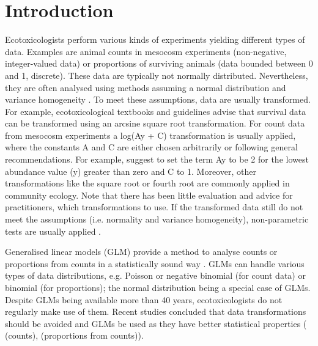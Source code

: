 \documentclass[twocolumn, natbib]{svjour3}
\providecommand{\DIFadd}[1]{{\protect\color{blue}\uwave{#1}}} %
\providecommand{\DIFaddbegin}{} %
\providecommand{\DIFaddend}{} %
\providecommand{\DIFdelbegin}{} %
\providecommand{\DIFdelend}{} %
\begin{document}
\section{Introduction}
\label{sec:intro}
Ecotoxicologists perform various kinds of experiments yielding different types of data.
Examples are animal counts in mesocosm experiments (non-negative, integer-valued data) or proportions of surviving animals (data bounded between 0 and 1, discrete).
These data are typically not normally distributed. 
Nevertheless, they are often analysed using methods assuming a normal distribution and variance homogeneity \citep{wang_making_2011}. 
To meet these assumptions, data are usually transformed.
For example, ecotoxicological textbooks \citep{newman_quantitative_2012} and guidelines \citep{epa_methods_2002,oecd_current_2006} advise that survival data can be transformed using an arcsine square root transformation. 
For count data from mesocosm experiments a log(Ay + C) transformation is usually applied, where the constants A and C are either chosen arbitrarily or following general recommendations. 
For example, \citet{van_den_brink_impact_2000} suggest to set the term Ay to be 2 for the lowest abundance value (y) greater than zero and C to 1. 
Moreover, other transformations like the square root or fourth root are commonly applied in community ecology.
Note that there has been little evaluation and advice for practitioners, which transformations to use.
If the transformed data still do not meet the assumptions (i.e. normality and variance homogeneity), non-parametric tests are usually applied \citep{wang_making_2011}.

Generalised linear models (GLM) provide a method to analyse counts or proportions from counts in a  statistically sound way \citep{nelder_generalized_1972}.
GLMs can handle various types of data distributions, e.g. Poisson or negative binomial (for count data) or binomial (for proportions); the normal distribution being a special case of GLMs.
Despite GLMs being available \DIFaddbegin \DIFadd{for }\DIFaddend more than 40 years, ecotoxicologists do not regularly make use of them.
Recent studies concluded that data transformations should be avoided and GLMs be used as they have better statistical properties (\DIFdelbegin %
\DIFdelend \DIFaddbegin \citealt{ohara_not_2010,warton_many_2005} \DIFaddend (counts), \DIFdelbegin %
\DIFdelend \DIFaddbegin \citealt{warton_arcsine_2011} \DIFaddend (proportions from counts)). 
\end{document}
